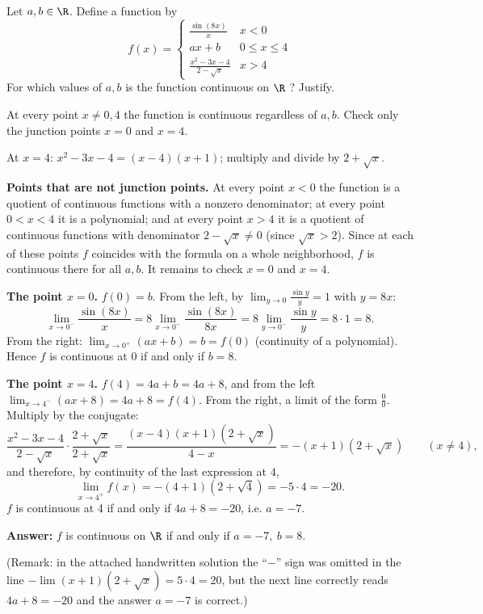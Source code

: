 
\begin{question}
Let $a,b\in\R$. Define a function by
\[
f(x)=\begin{cases}
\frac{\sin(8x)}{x} & x<0\\
ax+b & 0\le x\le 4\\
\frac{x^2-3x-4}{2-\sqrt{x}} & x>4
\end{cases}
\]
For which values of $a,b$ is the function continuous on $\R$ ? Justify.
\end{question}

\begin{hint}
At every point $x\neq0,4$ the function is continuous regardless of $a,b$. Check only the junction points $x=0$ and $x=4$.
\end{hint}

\begin{hint}
At $x=4$: $x^2-3x-4=(x-4)(x+1)$; multiply and divide by $2+\sqrt x$.
\end{hint}

\begin{solution}
\textbf{Points that are not junction points.} At every point $x<0$ the function is a quotient of continuous functions with a nonzero denominator; at every point $0<x<4$ it is a polynomial; and at every point $x>4$ it is a quotient of continuous functions with denominator $2-\sqrt x\neq0$ (since $\sqrt x>2$). Since at each of these points $f$ coincides with the formula on a whole neighborhood, $f$ is continuous there for all $a,b$. It remains to check $x=0$ and $x=4$.

\textbf{The point $x=0$.} $f(0)=b$. From the left, by $\lim_{y\to0}\frac{\sin y}{y}=1$ with $y=8x$:
\[
\lim_{x\to0^-}\frac{\sin(8x)}{x}=8\lim_{x\to0^-}\frac{\sin(8x)}{8x}=8\lim_{y\to0^-}\frac{\sin y}{y}=8\cdot1=8 .
\]
From the right: $\lim_{x\to0^+}(ax+b)=b=f(0)$ (continuity of a polynomial). Hence $f$ is continuous at 0 if and only if $\boxed{b=8}$.

\textbf{The point $x=4$.} $f(4)=4a+b=4a+8$, and from the left $\lim_{x\to4^-}(ax+8)=4a+8=f(4)$. From the right, a limit of the form $\frac00$. Multiply by the conjugate:
\[
\frac{x^2-3x-4}{2-\sqrt x}\cdot\frac{2+\sqrt x}{2+\sqrt x}=\frac{(x-4)(x+1)(2+\sqrt x)}{4-x}=-(x+1)(2+\sqrt x)\qquad(x\neq4),
\]
and therefore, by continuity of the last expression at 4,
\[
\lim_{x\to4^+}f(x)=-(4+1)(2+\sqrt4)=-5\cdot4=-20 .
\]
$f$ is continuous at 4 if and only if $4a+8=-20$, i.e. $\boxed{a=-7}$.

\textbf{Answer:} $f$ is continuous on $\R$ if and only if $a=-7,\ b=8$.

(Remark: in the attached handwritten solution the ``$-$'' sign was omitted in the line $-\lim(x+1)(2+\sqrt x)=5\cdot4=20$, but the next line correctly reads $4a+8=-20$ and the answer $a=-7$ is correct.)
\end{solution}
